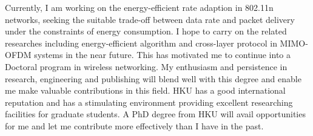 \documentclass[journal,onecolumn]{IEEEtran}
\begin{document}
Currently, I am working on the energy-efficient rate adaption in 802.11n networks, seeking the suitable trade-off between data rate and packet delivery under the constraints of energy consumption. I hope to carry on the related researches including energy-efficient algorithm and cross-layer protocol in MIMO-OFDM systems in the near future. This has motivated me to continue into a Doctoral program in wireless networking. My enthusiasm and persistence in research, engineering and publishing will blend well with this degree and enable me make valuable contributions in this field. HKU has a good international reputation and has a stimulating environment providing excellent researching facilities for graduate students. A PhD degree from HKU will avail opportunities for me and let me contribute more effectively than I have in the past.
\end{document}

